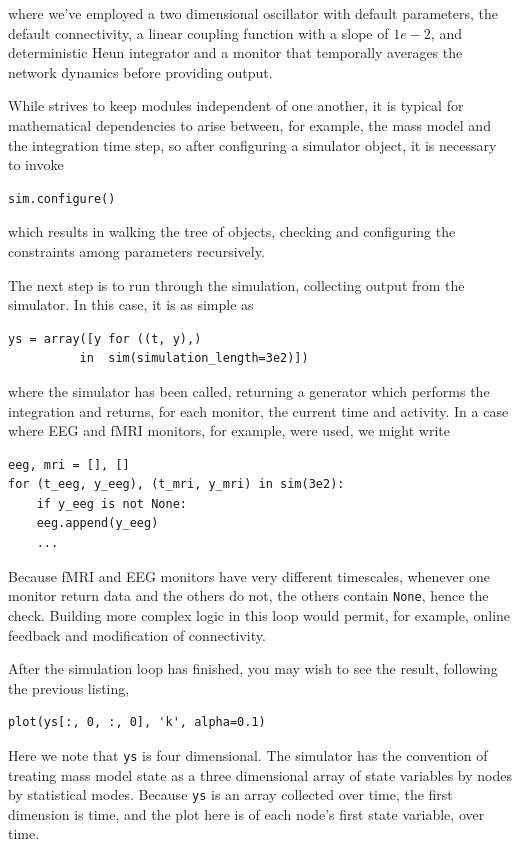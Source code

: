 \noindent where we've employed a two dimensional oscillator
with default parameters, the default connectivity, a linear 
coupling function with a slope of $1e-2$, and deterministic
Heun integrator and a monitor that temporally averages the 
network dynamics before providing output.

While \TVB strives to keep modules independent of one another,
it is typical for mathematical dependencies to arise between, 
for example, the mass model and the integration time step, so
after configuring a simulator object, it is necessary to invoke

\begin{lstlisting}
sim.configure()
\end{lstlisting}

which results in walking the tree of objects, checking and 
configuring the constraints among parameters recursively.

The next step is to run through the simulation, collecting
output from the simulator. In this case, it is as simple as
\begin{lstlisting}
ys = array([y for ((t, y),) 
          in  sim(simulation_length=3e2)])
\end{lstlisting}
\noindent where the simulator has been called, returning a 
generator which performs the integration and returns, for each
monitor, the current time and activity. In a case where EEG 
and fMRI monitors, for example, were used, we might write
\begin{lstlisting}
eeg, mri = [], []
for (t_eeg, y_eeg), (t_mri, y_mri) in sim(3e2):
    if y_eeg is not None:
    eeg.append(y_eeg)
    ...
\end{lstlisting}
\noindent Because fMRI and EEG monitors have very different
timescales, whenever one monitor return data and the others do
not, the others contain \texttt{None}, hence the check. Building
more complex logic in this loop would permit, for example, online
feedback and modification of connectivity. 

After the simulation loop has finished, you may wish to see the
result, following the previous listing, 
\begin{lstlisting}
plot(ys[:, 0, :, 0], 'k', alpha=0.1)
\end{lstlisting}
\noindent Here we note that \texttt{ys} is four dimensional. The 
simulator has the convention of treating  mass model state as a
three dimensional array of state variables by nodes by statistical
modes. Because \texttt{ys} is an array collected over time, the first
dimension is time, and the plot here is of each node's first state
variable, over time.

